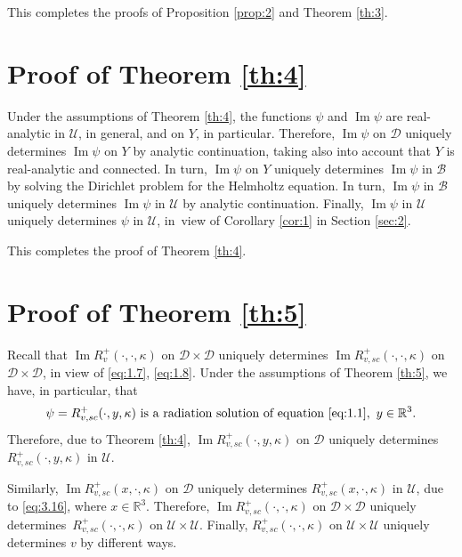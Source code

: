 \documentclass[JEP,XML,SOM,Unicode,NoEqCountersInSection,published]{cedram}
\newcommand{\RR}{\mathbb R}
\renewcommand{\Im}{\mathop{\mathrm{Im}}}
\theoremstyle{definition}
\begin{document}
This completes the proofs of Proposition \ref{prop:2} and Theorem \ref{th:3}.

\section{Proof of Theorem \ref{th:4}}\label{sec:6}
Under the assumptions of Theorem \ref{th:4}, the functions $\psi$ and $\Im \psi$ are real-analytic in $\mathcal{U}$, in general, and on $Y$, in particular.
Therefore, $\Im \psi$ on $\mathcal{D}$ uniquely determines $\Im \psi$ on $Y$ by analytic continuation, taking also into account that $Y$ is real-analytic and connected.
In turn, $\Im \psi$ on $Y$ uniquely determines $\Im \psi$ in $\mathcal{B}$ by solving the Dirichlet problem for the Helmholtz equation.
In turn, $\Im \psi$ in $\mathcal{B}$ uniquely determines $\Im \psi$ in $\mathcal{U}$ by analytic continuation.
Finally, $\Im \psi$ in $\mathcal{U}$ uniquely determines $\psi$ in $\mathcal{U}$, in~view of Corollary \ref{cor:1} in Section \ref{sec:2}.

This completes the proof of Theorem \ref{th:4}.

\section{Proof of Theorem \ref{th:5}}\label{sec:7}
Recall that $\Im R_v^+(\cdot, \cdot, \kappa)$ on $\mathcal{D} \times \mathcal{D}$ uniquely determines $\Im R_{v,sc}^+(\cdot, \cdot, \kappa)$ on $\mathcal{D} \times \mathcal{D}$,
in view of \eqref{eq:1.7}, \eqref{eq:1.8}.
Under the assumptions of Theorem \ref{th:5}, we have, in particular, that
\begin{equation}
\label{eq:7.1}
\psi=R_{v,sc}^+(\cdot, y, \kappa)\text{ is a radiation solution of equation \eqref{eq:1.1}},\ y\in \RR^3.
\end{equation}
Therefore, due to Theorem \ref{th:4}, $\Im R_{v,sc}^+(\cdot, y, \kappa)$ on $\mathcal{D}$ uniquely determines $R_{v,sc}^+(\cdot, y, \kappa)$ in $\mathcal{U}$.

Similarly, $\Im R_{v,sc}^+(x, \cdot, \kappa)$ on $\mathcal{D}$ uniquely determines $R_{v,sc}^+(x, \cdot, \kappa)$ in $\mathcal{U}$,
due to \eqref{eq:3.16}, where $x\!\in\! \mathbb R^3$.
Therefore, $\Im R_{v,sc}^+(\cdot, \cdot, \kappa)$ on $\mathcal{D} \times \mathcal{D}$ uniquely determines~$R_{v,sc}^+(\cdot, \cdot, \kappa)$ on $\mathcal{U} \times \mathcal{U}$.
Finally, $R_{v,sc}^+(\cdot, \cdot, \kappa)$ on $\mathcal{U} \times \mathcal{U}$ uniquely determines $v$ by different ways.
\end{document}
